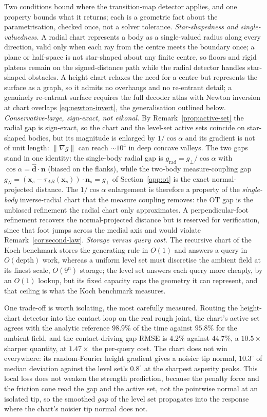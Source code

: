 \documentclass{svjour3}                 %
\newcommand{\norm}[1]{\lVert#1\rVert}
\newcommand{\dhat}{\hat{\bm{d}}}
\newcommand{\nbf}{\bm{n}}
\newcommand{\xbf}{\bm{x}}
\newcommand{\gn}{g_{\scriptscriptstyle N}}
\newcommand{\tmap}{\tau_{AB}}
\newcommand{\grad}{\nabla}
\begin{document}
Two conditions bound where the transition-map detector applies, and one property bounds what it returns; each is
a geometric fact about the parametrisation, checked once, not a solver tolerance. \emph{Star-shapedness and
single-valuedness.} A radial chart represents a body as a single-valued radius along every direction, valid only
when each ray from the centre meets the boundary once; a plane or half-space is not star-shaped about any finite
centre, so floors and rigid platens remain on the signed-distance path while the radial detector handles
star-shaped obstacles. A height chart relaxes the need for a centre but represents the surface as a graph, so it
admits no overhangs and no re-entrant detail; a genuinely re-entrant surface requires the full decoder atlas with
Newton inversion at chart overlaps \eqref{eq:newton-invert}, the generalisation outlined below.
\emph{Conservative-large, sign-exact, not eikonal.} By Remark~\ref{prop:active-set} the radial gap is
sign-exact, so the chart and the level-set active sets coincide on star-shaped bodies, but its magnitude is
enlarged by $1/\cos\alpha$ and its gradient is not of unit length: $\norm{\grad g}$ can reach $\sim10^{4}$ in deep
concave valleys. The two gaps stand in one identity: the single-body radial gap is
$g_{\mathrm{rad}}=g_\perp/\cos\alpha$ with $\cos\alpha=\dhat\cdot\nbf$ (biased on the flanks), while the
two-body measure-coupling gap $\gn=(\xbf_s-\tmap(\xbf_s))\!\cdot\!\nbf_s=g_\perp$ of Section~\ref{app:ot} is the
exact normal-projected distance. The $1/\cos\alpha$ enlargement is therefore a property of the \emph{single-body}
inverse-radial chart that the measure coupling removes: the OT gap is the unbiased refinement the radial chart
only approximates. A perpendicular-foot refinement recovers the normal-projected distance but is reserved for
verification, since that foot jumps across the medial axis and would violate Remark~\ref{cor:second-law}.
\emph{Storage versus query cost.} The recursive chart of the Koch benchmark stores the generating rule in $O(1)$ and answers a
query in $O(\text{depth})$ work, whereas a uniform level set must discretise the ambient field at its finest scale,
$O(9^{n})$ storage; the level set answers each query more cheaply, by an $O(1)$ lookup, but its fixed capacity
caps the geometry it can represent, and that ceiling is what the Koch benchmark measures.

One trade-off is worth isolating, the most carefully measured. Routing the height-chart detector
into the contact loop on the real rough joint, the chart's active set agrees with the analytic reference $98.9\%$
of the time against $95.8\%$ for the ambient field, and the contact-driving gap RMSE is $4.2\%$ against $44.7\%$,
a $10.5\times$ sharper quantity, at $1.47\times$ the per-query cost. The chart does not win everywhere: its
random-Fourier height gradient gives a noisier tip normal, $10.3^{\circ}$ of median deviation against the level
set's $0.8^{\circ}$ at the sharpest asperity peaks. This local loss does not weaken the strength prediction,
because the penalty force and the friction cone read the gap and the active set, not the pointwise normal at an
isolated tip, so the smoothed \emph{gap} of the level set propagates into the response where the chart's noisier
tip normal does not.
\end{document}
